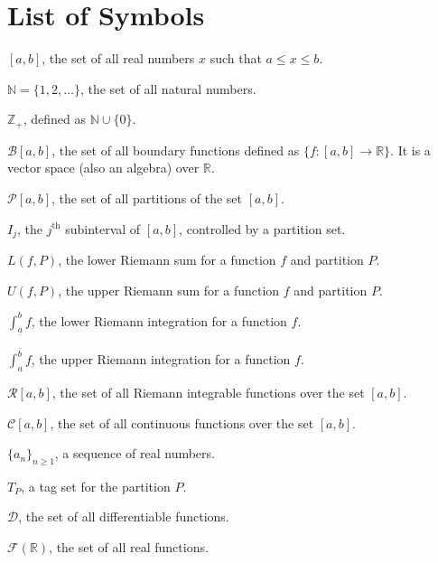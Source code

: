 \documentclass[15pt,a4paper]{book}
\theoremstyle{definition}
\newcommand{\R}{\mathbb{R}} %
\newcommand{\cC}{\mathcal{C}}
\newcommand{\cD}{\mathcal{D}}
\newcommand{\cF}{\mathcal{F}}
\begin{document}
\chapter*{List of Symbols}
\begin{notationlist}
    \item $[a,b]$, the set of all real numbers $x$ such that $a \leq x \leq b$.
    \item $\mathbb{N} = \{1,2,\ldots\}$, the set of all natural numbers.
    \item $\mathbb{Z}_{+}$, defined as $\mathbb{N} \cup \{0\}$.
    \item $\mathcal{B}[a,b]$, the set of all boundary functions defined as $\{f:[a,b] \to \mathbb{R}\}$. It is a vector space (also an algebra) over $\mathbb{R}$.
    \item $\mathcal{P}[a,b]$, the set of all partitions of the set $[a,b]$.
    \item $I_{j}$, the $j^{\text{th}}$ subinterval of $[a,b]$, controlled by a partition set.
    \item $L(f,P)$, the lower Riemann sum for a function $f$ and partition $P$.
    \item $U(f,P)$, the upper Riemann sum for a function $f$ and partition $P$.
    \item $\int_{\underline{a}}^{b} f$, the lower Riemann integration for a function $f$.
    \item $\int_{a}^{\overline{b}} f$, the upper Riemann integration for a function $f$.
    \item $\mathcal{R}[a,b]$, the set of all Riemann integrable functions over the set $[a,b]$.
    \item $\cC[a,b]$, the set of all continuous functions over the set $[a,b]$.
    \item $\{a_{n}\}_{n \geq 1}$, a sequence of real numbers.
    \item $T_{P}$, a tag set for the partition $P$.
    \item $\cD$, the set of all differentiable functions.
    \item $\cF (\R)$, the set of all real functions.
\end{notationlist}

\newpage
\setcounter{tocdepth}{2}
\tableofcontents

\newpage
{}
\pagestyle{fancy}


\end{document}
